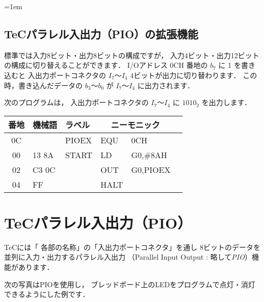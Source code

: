 \begin{framed}{\parindent=1em
  \subsection*{TeCパラレル入出力（PIO）の拡張機能}
  {\small 標準では入力8ビット・出力8ビットの構成ですが，
    入力4ビット・出力12ビットの構成に切り替えることができます．
    I/Oアドレス 0CH 番地の $b_7$ に 1 を書き込むと
    入出力ポートコネクタの $I_7〜I_4$ 4ビットが出力に切り替わります．
    この時，書き込んだデータの $b_3〜b_0$ が $I_7〜I_4$ に出力されます．
    
    次のプログラムは，
    入出力ポートコネクタの $I_7〜I_4$ に $1010_2$ を出力します．

    {\ttfamily\small\begin{center}
      \begin{tabular}{|c|l|l|l l|l}
        \hline
        番地 & 機械語 & ラベル & \multicolumn{2}{|c|}{ニーモニック} \\
        \hline
        0C &       & PIOEX & EQU  & 0CH      \\
        00 & 13 8A & START & LD   & G0,\#8AH \\
        02 & C3 0C &       & OUT  & G0,PIOEX \\ 
        04 & FF    &       & HALT &          \\
        \hline
      \end{tabular}
  \end{center}}}
}\end{framed}

\newpage
\section{TeCパラレル入出力（PIO）}
\label{pio}

TeCには「 各部の名称」の「入出力ポートコネクタ」を通し
8ビットのデータを並列に入力・出力するパラレル入出力
（Parallel Input Output : 略して\emph{PIO}）機能があります．

次の写真はPIOを使用し，
ブレッドボード上のLEDをプログラムで点灯・消灯できるようにした例です．

\begin{center}
\end{center}

